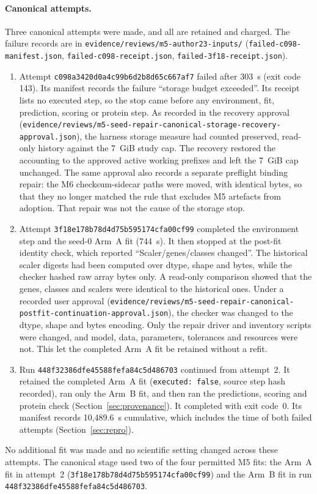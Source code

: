 \documentclass[11pt]{article}
\newcommand{\runid}{\nolinkurl{448f32386dfe45588fefa84c5d486703}}
\begin{document}
\paragraph{Canonical attempts.} Three canonical attempts were made, and all are retained and charged. The failure records are in \nolinkurl{evidence/reviews/m5-author23-inputs/} (\nolinkurl{failed-c098-manifest.json}, \nolinkurl{failed-c098-receipt.json}, \nolinkurl{failed-3f18-receipt.json}).
\begin{enumerate}
\item Attempt \nolinkurl{c098a3420d0a4c99b6d2b8d65c667af7} failed after 303~s (exit code 143). Its manifest records the failure ``storage budget exceeded''. Its receipt lists no executed step, so the stop came before any environment, fit, prediction, scoring or protein step. As recorded in the recovery approval (\nolinkurl{evidence/reviews/m5-seed-repair-canonical-storage-recovery-approval.json}), the harness storage measure had counted preserved, read-only history against the 7~GiB study cap. The recovery restored the accounting to the approved active working prefixes and left the 7~GiB cap unchanged. The same approval also records a separate preflight binding repair: the M6 checksum-sidecar paths were moved, with identical bytes, so that they no longer matched the rule that excludes M5 artefacts from adoption. That repair was not the cause of the storage stop.
\item Attempt \nolinkurl{3f18e178b78d4d75b595174cfa00cf99} completed the environment step and the seed-0 Arm~A fit (744~s). It then stopped at the post-fit identity check, which reported ``Scaler/genes/classes changed''. The historical scaler digests had been computed over dtype, shape and bytes, while the checker hashed raw array bytes only. A read-only comparison showed that the genes, classes and scalers were identical to the historical ones. Under a recorded user approval (\nolinkurl{evidence/reviews/m5-seed-repair-canonical-postfit-continuation-approval.json}), the checker was changed to the dtype, shape and bytes encoding. Only the repair driver and inventory scripts were changed, and model, data, parameters, tolerances and resources were not. This let the completed Arm~A fit be retained without a refit.
\item Run \runid{} continued from attempt~2. It retained the completed Arm~A fit (\verb|executed: false|, source step hash recorded), ran only the Arm~B fit, and then ran the predictions, scoring and protein check (Section~\ref{sec:provenance}). It completed with exit code~0. Its manifest records 10{,}489.6~s cumulative, which includes the time of both failed attempts (Section~\ref{sec:repro}).
\end{enumerate}
No additional fit was made and no scientific setting changed across these attempts. The canonical stage used two of the four permitted M5 fits: the Arm~A fit in attempt~2 (\nolinkurl{3f18e178b78d4d75b595174cfa00cf99}) and the Arm~B fit in run \runid.
\end{document}
